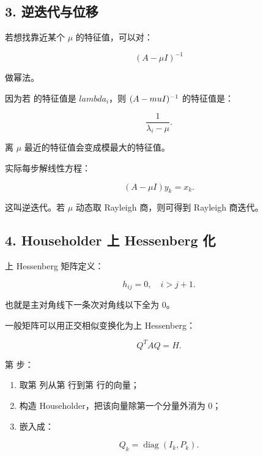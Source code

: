 \documentclass[11pt,a4paper]{ctexart}
\newcommand{\code}[1]{\begingroup\ttfamily\small #1\endgroup}
\begin{document}

\subsection*{3. 逆迭代与位移}


若想找靠近某个 $\mu$ 的特征值，可以对：

\[
(A-\mu I)^{-1}
\]

做幂法。

因为若 \code{} 的特征值是 $lambda_i$，则 $(A-\\mu I)^{-1}$ 的特征值是：

\[
\frac{1}{\lambda_i-\mu}.
\]

离 $\mu$ 最近的特征值会变成模最大的特征值。

实际每步解线性方程：

\[
(A-\mu I)y_k=x_k.
\]

这叫逆迭代。若 $\mu$ 动态取 Rayleigh 商，则可得到 Rayleigh 商迭代。


\subsection*{4. Householder 上 Hessenberg 化}


上 Hessenberg 矩阵定义：

\[
h_{ij}=0,\quad i>j+1.
\]

也就是主对角线下一条次对角线以下全为 0。

一般矩阵可以用正交相似变换化为上 Hessenberg：

\[
Q^TAQ=H.
\]

第 \code{} 步：

\begin{enumerate}

\item 取第 \code{} 列从第 \code{} 行到第 \code{} 行的向量；

\item 构造 Householder，把该向量除第一个分量外消为 0；

\item 嵌入成：

\end{enumerate}

\[
Q_k=\operatorname{diag}(I_k,P_k).
\]
\end{document}
